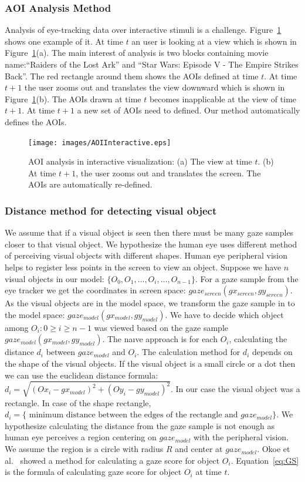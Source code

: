 \subsubsection{AOI Analysis Method}
Analysis of eye-tracking data over interactive stimuli is a challenge. Figure~\ref{fig:AOIInteractive} shows one example of it. At time $t$ an user is looking at a view which is shown in Figure~\ref{fig:AOIInteractive}(a). The main interest of analysis is two blocks containing movie name:``Raiders of the Lost Ark'' and ``Star Wars: Episode V - The Empire Strikes Back''. The red rectangle around them shows the AOIs defined at time $t$. At time $t+1$ the user zooms out and translates the view downward which is shown in Figure~\ref{fig:AOIInteractive}(b). The AOIs drawn at time $t$ becomes inapplicable at the view of time $t+1$. At time $t+1$ a new set of AOIs need to defined. Our method automatically defines the AOIs.

\begin{figure}[htb]
  \centering
  \texttt{[image: images/AOIInteractive.eps]}
  \caption{AOI analysis in interactive visualization: (a) The view at time $t$. (b) At time $t+1$, the user zooms out and translates the screen. The AOIs are automatically re-defined.}
	\label{fig:AOIInteractive}
\end{figure}

\subsubsection{Distance method for detecting visual object}
We assume that if a visual object is seen then there must be many gaze samples closer to that visual object. We hypothesize the human eye uses different method of perceiving visual objects with different shapes. Human eye peripheral vision helps to register less points in the screen to view an object. Suppose we have $n$ visual objects in our model: $\{O_0, O_1, \ldots, O_i, \ldots, O_{n-1} \}$. For a gaze sample from the eye tracker we get the coordinates in screen space: $gaze_{screen}(gx_{screen}, gy_{screen})$. As the visual objects are in the model space, we transform the gaze sample in to the model space: $gaze_{model}(gx_{model}, gy_{model})$. We have to decide which object among ${O_i: 0 \geq i \geq n-1}$ was viewed based on the gaze sample $gaze_{model}(gx_{model}, gy_{model})$. The na{\i}ve approach is for each $O_i$, calculating the distance $d_i$ between $gaze_{model}$ and $O_i$. The calculation method for $d_i$ depends on the shape of the visual objects. If the visual object is a small circle or a dot then we can use the euclidean distance formula: $d_i =\sqrt{{(Ox_i-gx_{model})}^2+{(Oy_i-gy_{model})}^2}$. In our case the visual object was a rectangle. In case of the shape rectangle, $d_i =\{ \text{ minimum distance between the edges of the rectangle and } gaze_{model}\}$. We hypothesize calculating the distance from the gaze sample is not enough as human eye perceives a region centering on $gaze_{model}$ with the peripheral vision. We assume the region is a circle with radius $R$ and center at $gaze_{model}$.  Okoe et al.~\cite{okoe2014gaze} showed a method for calculating a gaze score for object $O_i$. Equation~\ref{eq:GS} is the formula of calculating gaze score for object $O_i$ at time $t$. 


